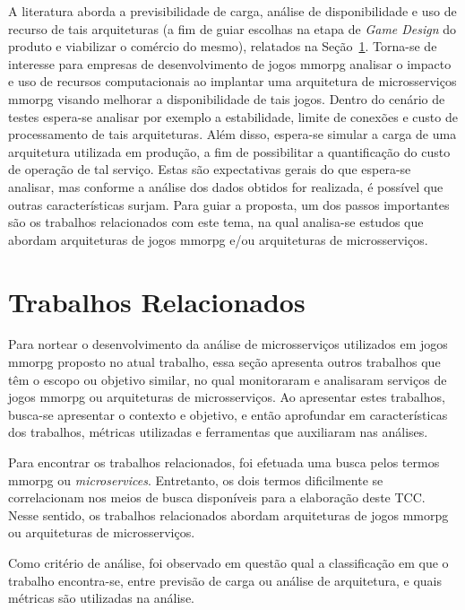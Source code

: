 A literatura aborda a previsibilidade de carga, análise de disponibilidade e uso de recurso de tais arquiteturas (a fim de guiar escolhas na etapa de \textit{Game Design} do produto e viabilizar o comércio do mesmo), relatados na Seção~\ref{sec:similares}.
%
Torna-se de interesse para empresas de desenvolvimento de jogos \ac{mmorpg} analisar o impacto e uso de recursos computacionais ao implantar uma arquitetura de microsserviços \ac{mmorpg} visando melhorar a disponibilidade de tais jogos.
%
Dentro do cenário de testes espera-se analisar por exemplo a estabilidade, limite de conexões e custo de processamento de tais arquiteturas.
%
Além disso, espera-se simular a carga de uma arquitetura utilizada em produção, a fim de possibilitar a quantificação do custo de operação de tal serviço.
%
Estas são expectativas gerais do que espera-se analisar, mas conforme a análise dos dados obtidos for realizada, é possível que outras características surjam.
%
Para guiar a proposta, um dos passos importantes são os trabalhos relacionados com este tema, na qual analisa-se estudos que abordam arquiteturas de jogos \ac{mmorpg} e/ou arquiteturas de microsserviços.



\section{Trabalhos Relacionados}
\label{sec:similares}



Para nortear o desenvolvimento da análise de microsserviços utilizados em jogos \ac{mmorpg} proposto no atual trabalho, essa seção apresenta outros trabalhos que têm o escopo ou objetivo similar, no qual monitoraram e analisaram serviços de jogos \ac{mmorpg} ou arquiteturas de microsserviços.
%
Ao apresentar estes trabalhos, busca-se apresentar o contexto e objetivo, e então aprofundar em características dos trabalhos, métricas utilizadas e ferramentas que auxiliaram nas análises.


Para encontrar os trabalhos relacionados, foi efetuada uma busca pelos termos \ac{mmorpg} ou \textit{microservices}.
%
Entretanto, os dois termos dificilmente se correlacionam nos meios de busca disponíveis para a elaboração deste TCC.
%
Nesse sentido, os trabalhos relacionados abordam arquiteturas de jogos \ac{mmorpg} ou arquiteturas de microsserviços.



Como critério de análise, foi observado em questão qual a classificação em que o trabalho encontra-se, entre previsão de carga ou análise de arquitetura, e quais métricas são utilizadas na análise.

